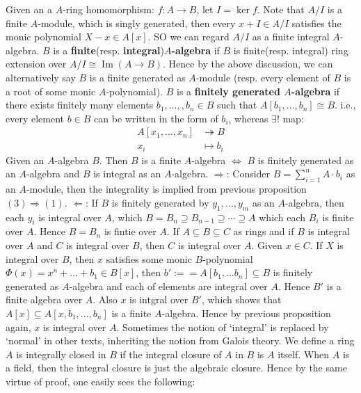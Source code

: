 \documentclass[12pt]{article}
\theoremstyle{definition}
\theoremstyle{plain}
\DeclareMathOperator{\im}{Im}
\newcommand{\surj}{\twoheadrightarrow}
\begin{document}
\medskip
Given an a $A$-ring homomorphism: $f:A\to B$, let $I=\ker f$. Note that $A/I$ is a finite $A$-module, which is singly generated, then every $x+I\in A/I$ satisfies the monic polynomial $X-x\in A[x]$. SO we can regard $A/I$ as a finite integral $A$-algebra.
\Def $B$ is a \textbf{finite}(resp. \textbf{integral})\textbf{$A$-algebra} if $B$ is finite(resp. integral) ring extension over $A/I\cong\im(A\to B)$. Hence by the above discussion, we can alternatively say $B$ is a finite generated as $A$-module (resp. every element of $B$ is a root of some monic $A$-polynomial).
\Def $B$ is a \textbf{finitely generated $A$-algebra} if there exists finitely many elements $b_1, ...,, b_n\in B$ such that $A[b_1, ..., b_n]\cong B$. i.e., every element $b\in B$ can be written in the form of $b_i$, whereas $\exists!$ map:
\begin{equation*}
  \begin{split}
    A[x_1, ..., x_n]&\surj B\\
    x_i&\mapsto b_i
  \end{split}
\end{equation*}
\Cor Given an $A$-algebra $B$. Then $B$ is a finite $A$-algebra $\iff$ $B$ is finitely generated as an $A$-algebra and $B$ is integral as an $A$-algebra.
\proof $\Rightarrow$: Consider $B=\sum_{i=1}^n A\cdot b_i$ as an $A$-module, then the integrality is implied from previous proposition $(3)\Rightarrow (1)$.
\medskip
$\Leftarrow$: If $B$ is finitely generated by $y_1, ..., y_m$ as an $A$-algebra, then each $y_i$ is integral over $A$, which $B=B_n\supseteq B_{n-1}\supseteq\cdots \supseteq A$ which each $B_i$ is finite over $A$. Hence $B=B_n$ is fintie over $A$.
 If $A\subseteq B\subseteq C$ as rings and if $B$ is integral over $A$ and $C$ is integral over $B$, then $C$ is integral over $A$.
\proof Given $x\in C$. If $X$ is integral over $B$, then $x$ satisfies some monic $B$-polynomial $\Phi(x)=x^n+...+b_1\in B[x]$, then $b':==A[b_1, ...b_n]\subseteq B$ is finitely generated as $A$-algebra and each of elements are integral over $A$. Hence $B'$ is a finite algebra over $A$. Also $x$ is intgral over $B'$, which shows that $A[x]\subseteq A[x, b_1, ...,b_n]$ is a finite $A$-algebra. Hence by previous proposition again, $x$ is integral over $A$.
\Rmk Sometimes the notion of `integral' is replaced by `normal' in other texts, inheriting the notion from Galois theory.
\Def We define a ring $A$ is integrally closed in $B$ if the integral closure of $A$ in $B$ is $A$ itself.
\Rmk When $A$ is a field, then the integral closure is just the algebraic closure. Hence by the same virtue of proof, one easily sees the following:
\end{document}
